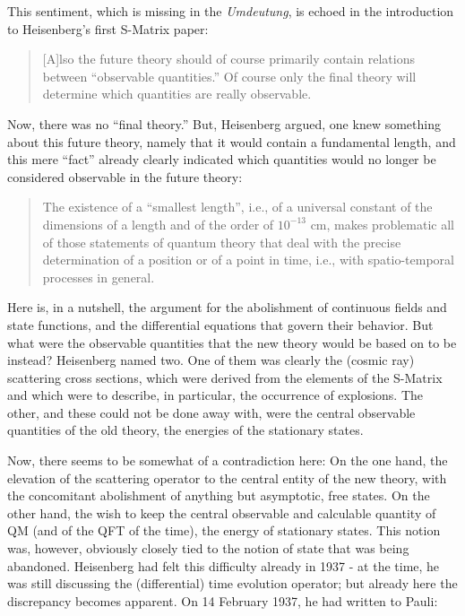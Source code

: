 \documentclass[12pt]{article}
\begin{document}
This sentiment, which is missing in the \emph{Umdeutung}, is echoed in the introduction to Heisenberg's first S-Matrix paper:

\begin{quote}
[A]lso the future theory should of course primarily contain relations between ``observable quantities.'' Of course only the final theory will determine which quantities are really observable.
\end{quote}

Now, there was no ``final theory.'' But, Heisenberg argued, one knew something about this future theory, namely that it would contain a fundamental length, and this mere ``fact'' already clearly indicated which quantities would no longer be considered observable in the future theory:

\begin{quote}
The existence of a ``smallest length'', i.e., of a universal constant of the dimensions of a length and of the order of $10^{-13}$ cm, makes problematic all of those statements of quantum theory that deal with the precise determination of a position or of a point in time, i.e., with spatio-temporal processes in general. 
\end{quote}

Here is, in a nutshell, the argument for the abolishment of continuous fields and state functions, and the differential equations that govern their behavior. But what were the observable quantities that the new theory would be based on to be instead?  Heisenberg named two. One of them was clearly the (cosmic ray) scattering cross sections, which were derived from the elements of the S-Matrix and which were to describe, in particular, the occurrence of explosions. The other, and these could not be done away with, were the central observable quantities of the old theory, the energies of the stationary states.

Now, there seems to be somewhat of a contradiction here: On the one hand, the elevation of the scattering operator to the central entity of the new theory, with the concomitant abolishment of anything but asymptotic, free states. On the other hand, the wish to keep the central observable and calculable quantity of QM (and of the QFT of the time), the energy of stationary states. This notion was, however, obviously closely tied to the notion of state that was being abandoned. Heisenberg had felt this difficulty already in 1937 - at the time, he was still discussing the (differential) time evolution operator; but already here the discrepancy becomes apparent. On 14 February 1937, he had written to Pauli:
\end{document}
